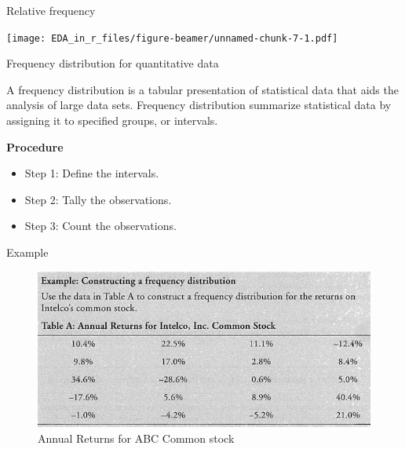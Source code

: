 \documentclass[ignorenonframetext,]{beamer}
\newenvironment{Shaded}{\begin{snugshade}}{\end{snugshade}}
\newcommand{\KeywordTok}[1]{\textcolor[rgb]{0.13,0.29,0.53}{\textbf{#1}}}
\newcommand{\DataTypeTok}[1]{\textcolor[rgb]{0.13,0.29,0.53}{#1}}
\newcommand{\StringTok}[1]{\textcolor[rgb]{0.31,0.60,0.02}{#1}}
\newcommand{\OperatorTok}[1]{\textcolor[rgb]{0.81,0.36,0.00}{\textbf{#1}}}
\newcommand{\NormalTok}[1]{#1}
\begin{document}
\begin{frame}[fragile]{Relative frequency}

\begin{Shaded}
\end{Shaded}

\texttt{[image: EDA\_in\_r\_files/figure-beamer/unnamed-chunk-7-1.pdf]}

\end{frame}

\begin{frame}{Frequency distribution for quantitative data}

A frequency distribution is a tabular presentation of statistical data
that aids the analysis of large data sets. Frequency distribution
summarize statistical data by assigning it to specified groups, or
intervals.

\textbf{Procedure}

\begin{itemize}
\item
  Step 1: Define the intervals.
\item
  Step 2: Tally the observations.
\item
  Step 3: Count the observations.
\end{itemize}

\end{frame}

\begin{frame}{Example}

\begin{figure}
\centering
\includegraphics{fig1.7.png}
\caption{Annual Returns for ABC Common stock}
\end{figure}

\end{frame}
\end{document}
